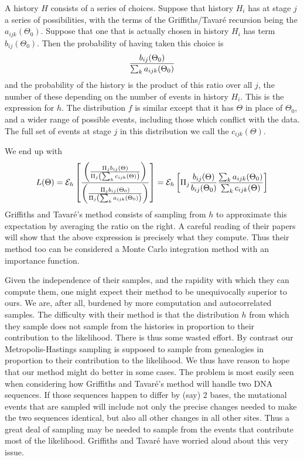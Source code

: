 A history $H$ consists of a series of choices.  Suppose that history $H_i$
has at stage $j$ a series of possibilities, with the terms of the Griffiths/Tavar\'e
recursion being the $a_{ijk}(\Theta_0)$.  Suppose that one that is actually
chosen in history $H_i$ has term $b_{ij}(\Theta_0)$.  Then the probability of
having taken this choice is
\begin{equation} %
{b_{ij}(\Theta_0) \over \sum_k a_{ijk}(\Theta_0)}
\end{equation}
and the probability of the history is the product of this ratio over all $j$,
the number of these depending on the number of events in history $H_i$.
This is the expression for $h$.  The distribution $f$ is similar except that
it has $\Theta$ in place of $\Theta_0$, and a wider range of possible
events, including those which conflict with the data.  The full set of
events at stage $j$ in this distribution we call the $c_{ijk}(\Theta)$.

We end up with
\begin{equation} %
L(\Theta) = {\cal E}_h\left[{\left({\Pi_j b_{ij}(\Theta) \over \Pi_j \left(\sum_
k c_{ijk}(\Theta)\right)}\right) \over \left({\Pi_j b_{ij}(\Theta_0) \over \Pi_j
 \left(\sum_k a_{ijk}(\Theta_0) \right)}\right)}\right]
 = {\cal E}_h \left[\Pi_j{b_{ij}(\Theta) \over b_{ij}(\Theta_0)}{\sum_k a_{ijk}(\Theta_0) \over
 \sum_k c_{ijk}(\Theta)}\right]
\end{equation}
Griffiths and Tavar\'e's method consists of sampling from $h$ to approximate
this expectation by averaging the ratio on the right.  A careful reading of
their papers will show that the above expression is precisely what they
compute.  Thus their method too can be considered a Monte Carlo integration
method with an importance function.

Given the independence of their samples, and the rapidity with which they
can compute them, one might expect their method to be unequivocally
superior to ours.  We are, after all, burdened by more computation and
autocorrelated samples.  The difficulty with their method is that the
distribution $h$ from which they sample does not sample from the histories
in proportion to their contribution to the likelihood.  There is thus some
wasted effort.  By contrast our Metropolis-Hastings sampling is supposed
to sample from genealogies in proportion to their contribution to the
likelihood.  We thus have reason to hope that our method might do
better in some cases.  The problem is most easily seen when considering
how Griffiths and Tavar\'e's method will handle two DNA sequences.  If those
sequences happen to differ by (say) 2 bases, the mutational events that are
sampled will include not only the precise changes needed to make the two
sequences identical, but also all other changes in all other sites.  Thus
a great deal of sampling may be needed to sample from the events that
contribute most of the likelihood.   Griffiths and Tavar\'e \cite{GT94c} have
worried aloud about this very issue.
 
